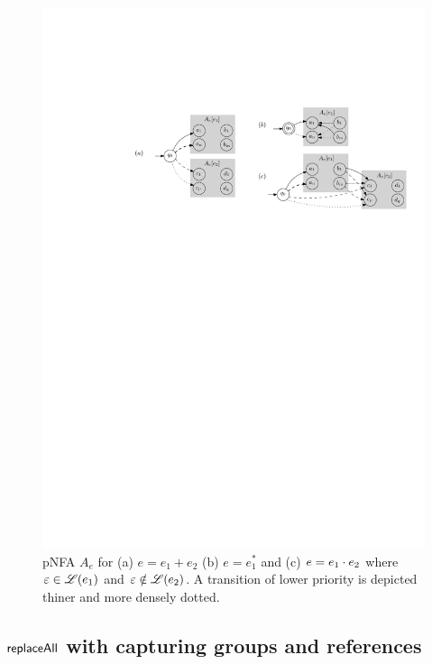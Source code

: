 \begin{figure}
 \centering
 \includegraphics{pglushkov_01}
 \caption{pNFA $A_e$ for (a) $e=e_1+e_2$ (b) $e=e_1^{\ast}$ and (c) $e=e_1 \cdot e_2$ where $\varepsilon \in \mathscr{L}(e_1)$ and $\varepsilon \notin \mathscr{L}(e_2)$. A transition of lower priority is depicted thiner and more densely dotted. }
 \label{fig:pglushkov}
\end{figure}
 
\subsection{$\mathsf{replaceAll}$ with capturing groups and references}



